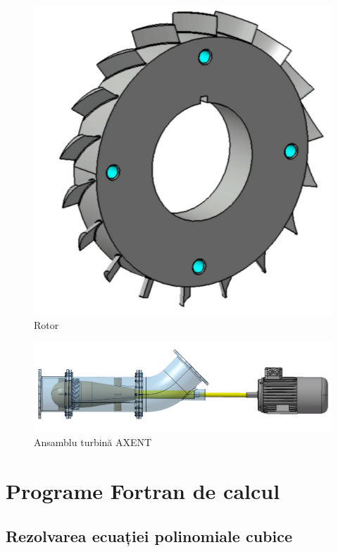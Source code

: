 \begin{figure}[h]
	\centering
	\includegraphics[scale=0.4]{figures/rotor-CAD.PNG}
	\caption{Rotor}
	\label{Rotor}
\end{figure}

\clearpage


\begin{figure}[h]
	\centering
	\includegraphics[scale=0.4, angle = -90]{figures/assy.jpg}
	\caption{Ansamblu turbină AXENT}
	\label{Ansamblu turbină AXENT}
\end{figure}

\clearpage


\section{Programe Fortran de calcul}

\subsection{Rezolvarea ecuației polinomiale cubice}

